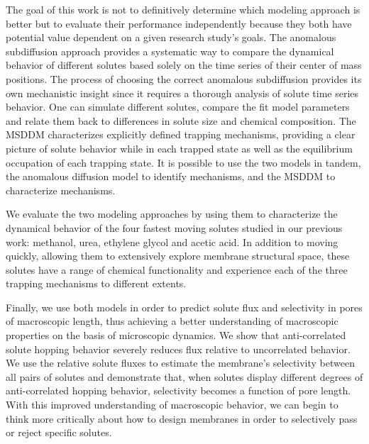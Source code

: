 \documentclass[aps,pre,preprint,groupedaddress,longbibliography]{revtex4-2}
\begin{document}
  The goal of this work is not to definitively determine which modeling approach
  is better but to evaluate their performance independently because they both
  have potential value dependent on a given research study's goals. The anomalous subdiffusion
  approach provides a systematic way to compare the dynamical behavior of different
  solutes based solely on the time series of their center of mass positions. The process
  of choosing the correct anomalous subdiffusion provides its own mechanistic insight
  since it requires a thorough analysis of solute time series behavior. One can simulate
  different solutes, compare the fit model parameters and relate them back to 
  differences in solute size and chemical composition. 
  The MSDDM characterizes 
  explicitly defined trapping mechanisms, providing a clear picture of solute behavior
  while in each trapped state as well as the equilibrium occupation of each trapping state.
  It is possible to use the two models in tandem, the anomalous diffusion model to
  identify mechanisms, and the MSDDM to characterize mechanisms. 
  
  We evaluate the two modeling approaches by using them to characterize the dynamical
  behavior of the four fastest moving solutes studied in our previous work:
  methanol, urea, ethylene glycol and acetic acid. In addition
  to moving quickly, allowing them to extensively explore membrane structural space,
  these solutes have a range of chemical functionality and experience each of the 
  three trapping mechanisms to different extents.
  
  Finally, we use both models in order to predict solute flux and selectivity in 
  pores of macroscopic length, thus achieving a better understanding
  of macroscopic properties on the basis of microscopic dynamics. We show that 
  anti-correlated solute hopping behavior severely reduces flux relative to 
  uncorrelated behavior. We use the relative solute fluxes to estimate the 
  membrane's selectivity between all pairs of solutes and demonstrate that, when 
  solutes display different degrees of anti-correlated hopping behavior, selectivity
  becomes a function of pore length. With this improved understanding of 
  macroscopic behavior, we can begin to think more critically about how to design 
  membranes in order to selectively pass or reject specific solutes.
\end{document}
